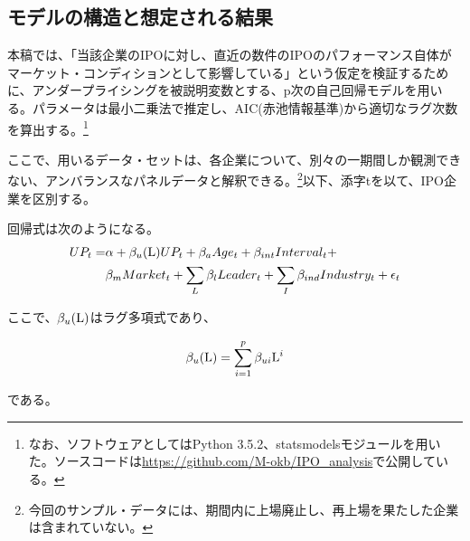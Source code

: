 \documentclass{jsarticle}
\begin{document}
\subsection{モデルの構造と想定される結果}
本稿では、「当該企業のIPOに対し、直近の数件のIPOのパフォーマンス自体がマーケット・コンディションとして影響している」という仮定を検証するために、アンダープライシングを被説明変数とする、p次の自己回帰モデルを用いる。パラメータは最小二乗法で推定し、AIC(赤池情報基準)から適切なラグ次数を算出する。\footnote[11]{なお、ソフトウェアとしてはPython 3.5.2、statsmodelsモジュールを用いた。ソースコードは\url{https://github.com/M-okb/IPO_analysis}で公開している。}\par
ここで、用いるデータ・セットは、各企業について、別々の一期間しか観測できない、アンバランスなパネルデータと解釈できる。\footnote[12]{今回のサンプル・データには、期間内に上場廃止し、再上場を果たした企業は含まれていない。}以下、添字tを以て、IPO企業を区別する。\par
回帰式は次のようになる。
\begin{equation}
\label{reg}
\begin{split}
	UP_t = &\alpha + \beta_u ({\rm L}) UP_t + \beta_a Age_t + \beta_{int} Interval_t + \\
	 &\beta_m Market_t + \sum_{L} \beta_l Leader_t +  \sum_{I} \beta_{ind} Industry_t + \epsilon_t
\end{split}
\end{equation}
\par
ここで、$\beta_u({\rm L})$はラグ多項式であり、\par
\begin{equation}
\beta_u({\rm L}) = \sum_{i=1}^p \beta_{ui} {\rm L}^i \nonumber
\end{equation}\par
である。\\ \par
\end{document}
